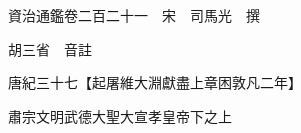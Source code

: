 










 


 
 


 

  
  
  
  
  





  
  
  
  
  
 
  

  

  
  
  



  

 
 

  
   




  

  
  


  　　資治通鑑卷二百二十一　宋　司馬光　撰

　　胡三省　音註

　　唐紀三十七【起屠維大淵獻盡上章困敦凡二年】

　　肅宗文明武德大聖大宣孝皇帝下之上


